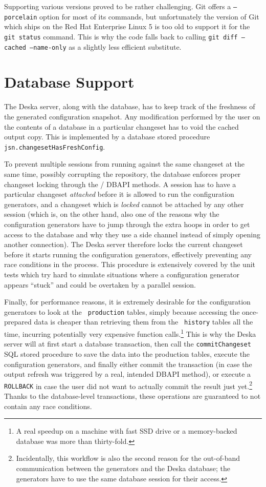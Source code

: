 \documentclass[deska]{subfiles}
\begin{document}
Supporting various versions proved to be rather challenging.  Git offers a {\tt --porcelain} option for most of its
commands, but unfortunately the version of Git which ships on the Red Hat Enterprise Linux 5 is too old to support it
for the {\tt git status} command.  This is why the code falls back to calling {\tt git diff --cached --name-only} as a
slightly less efficient substitute.

\section{Database Support}
\label{sec:cfggen-db-support}

The Deska server, along with the database, has to keep track of the freshness of the generated configuration snapshot.
Any modification performed by the user on the contents of a database in a particular changeset has to void the cached
output copy.  This is implemented by a database stored procedure {\tt jsn.changesetHasFreshConfig}.

To prevent multiple sessions from running against the same changeset at the same time, possibly corrupting the
repository, the database enforces proper changeset locking through the
/ DBAPI methods.  A session has to have a
particular changeset {\em attached} before it is allowed to run the configuration generators, and a changeset which is
{\em locked} cannot be attached by any other session (which is, on the other hand, also one of the reasons why the
configuration generators have to jump through the extra hoops in order to get access to the database and why they use a
side channel instead of simply opening another connection).  The Deska server therefore locks the current changeset
before it starts running the configuration generators, effectively preventing any race conditions in the process.  This
procedure is extensively covered by the unit tests which try hard to simulate situations where a configuration generator
appears ``stuck'' and could be overtaken by a parallel session.

Finally, for performance reasons, it is extremely desirable for the configuration generators to look at the {\tt
production} tables, simply because accessing the once-prepared data is cheaper than retrieving them from the {\tt
history} tables all the time, incurring potentially very expensive function calls.\footnote{A real speedup on a machine
with fast SSD drive or a memory-backed database was more than thirty-fold.}  This is why the Deska server will at
first start a database transaction, then call the {\tt commitChangeset} SQL stored procedure to save the data into the
production tables, execute the configuration generators, and finally either commit the transaction (in case the
output refresh was triggered by a real, intended  DBAPI method), or execute a {\tt
ROLLBACK} in case the user did not want to actually commit the result just yet.\footnote{Incidentally, this workflow is
also the second reason for the out-of-band communication between the generators and the Deska database; the generators
have to use the same database session for their access.} Thanks to the database-level transactions, these operations are
guaranteed to not contain any race conditions.
\end{document}

